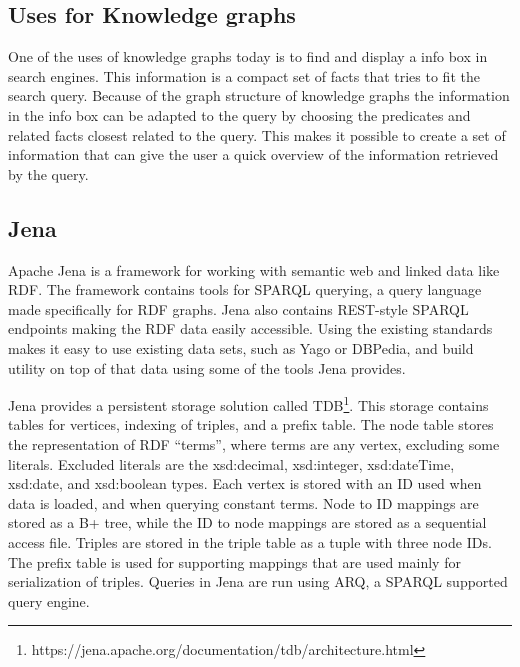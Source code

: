 
\subsection{Uses for Knowledge graphs}
One of the uses of knowledge graphs today is to find and display a info box in search engines. This information is a compact set of facts that tries to fit the search query. Because of the graph structure of knowledge graphs the information in the info box can be adapted to the query by choosing the predicates and related facts closest related to the query. This makes it possible to create a set of information that can give the user a quick overview of the information retrieved by the query.

\subsection{Jena}
Apache Jena is a framework for working with semantic web and linked data like RDF. The framework contains tools for SPARQL querying, a query language made specifically for RDF graphs. Jena also contains REST-style SPARQL endpoints making the RDF data easily accessible. Using the existing standards makes it easy to use existing data sets, such as Yago or DBPedia, and build utility on top of that data using some of the tools Jena provides.

Jena provides a persistent storage solution called TDB\footnote{https://jena.apache.org/documentation/tdb/architecture.html}. This storage contains tables for vertices, indexing of triples, and a prefix table. The node table stores the representation of RDF ``terms'', where terms are any vertex, excluding some literals. Excluded literals are the xsd:decimal, xsd:integer, xsd:dateTime, xsd:date, and xsd:boolean types. Each vertex is stored with an ID used when data is loaded, and when querying constant terms. Node to ID mappings are stored as a B+ tree, while the ID to node mappings are stored as a sequential access file. Triples are stored in the triple table as a tuple with three node IDs. The prefix table is used for supporting mappings that are used mainly for serialization of triples. Queries in Jena are run using ARQ, a SPARQL supported query engine.

\glsresetall
